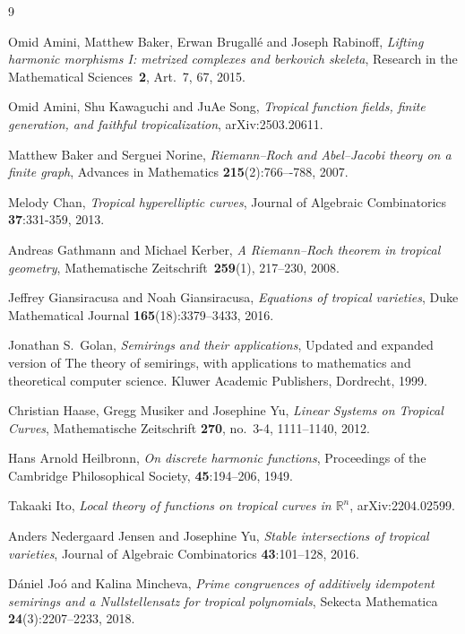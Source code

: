\documentclass[a4paper,12pt]{amsart}
\begin{document}
\begin{thebibliography}{9}

 Omid Amini, Matthew Baker, Erwan Brugall\'{e} and Joseph Rabinoff, \textit{Lifting harmonic morphisms I: metrized complexes and berkovich skeleta}, Research in the Mathematical Sciences~\textbf{2}, Art.~7, 67, 2015.

 Omid Amini, Shu Kawaguchi and JuAe Song, \textit{Tropical function fields, finite generation, and faithful tropicalization}, arXiv:2503.20611.

 Matthew Baker and Serguei Norine, \textit{Riemann--Roch and Abel–Jacobi theory on a finite graph}, Advances in Mathematics \textbf{215}(2):766–-788, 2007.

 Melody Chan, \textit{Tropical hyperelliptic curves}, Journal of Algebraic Combinatorics \textbf{37}:331-359, 2013.

 Andreas Gathmann and Michael Kerber, \textit{A Riemann--Roch theorem in tropical geometry}, Mathematische Zeitschrift~{\bf 259}(1), 217--230, 2008.

 Jeffrey Giansiracusa and Noah Giansiracusa, \textit{Equations of tropical varieties}, Duke Mathematical Journal \textbf{165}(18):3379--3433, 2016.

 Jonathan S.~Golan, \textit{Semirings and their applications}, Updated and expanded version of The theory of semirings, with applications to mathematics and theoretical computer science. Kluwer Academic Publishers, Dordrecht, 1999.

 Christian Haase, Gregg Musiker and Josephine Yu, \textit{Linear Systems on Tropical Curves}, Mathematische Zeitschrift {\bf 270}, no.~3-4, 1111--1140, 2012.

 Hans Arnold Heilbronn, \textit{On discrete harmonic functions}, Proceedings of the Cambridge Philosophical Society, \textbf{45}:194--206, 1949.

 Takaaki Ito, \textit{Local theory of functions on tropical curves in $\mathbb{R}^n$}, arXiv:2204.02599.

 Anders Nedergaard Jensen and Josephine Yu, \textit{Stable intersections of tropical varieties}, Journal of Algebraic Combinatorics \textbf{43}:101--128, 2016.

 D\'{a}niel Jo\'{o} and Kalina Mincheva, \textit{Prime congruences of additively idempotent semirings and a Nullstellensatz for tropical polynomials}, Sekecta Mathematica \textbf{24}(3):2207--2233, 2018.


\end{thebibliography}
\end{document}
